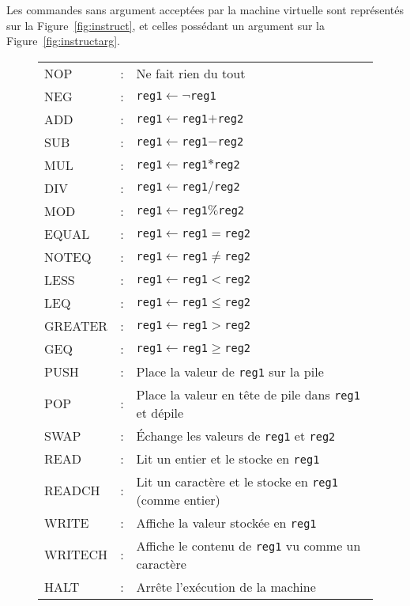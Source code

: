 \documentclass[12pt,a4paper]{article}
\begin{document}
Les commandes sans argument acceptées par la machine virtuelle sont
représentés sur la Figure~\ref{fig:instruct}, et celles possédant un
argument sur la Figure~\ref{fig:instructarg}.

\begin{figure}
  \centering
  \begin{tabular}{lll}
    NOP   &:& Ne fait rien du tout\\
    NEG   &:& \texttt{reg1}$\leftarrow\neg$\texttt{reg1}\\
    ADD   &:& \texttt{reg1}$\leftarrow$\texttt{reg1}$+$\texttt{reg2}\\
    SUB   &:& \texttt{reg1}$\leftarrow$\texttt{reg1}$-$\texttt{reg2}\\
    MUL   &:& \texttt{reg1}$\leftarrow$\texttt{reg1}$*$\texttt{reg2}\\
    DIV   &:& \texttt{reg1}$\leftarrow$\texttt{reg1}$/$\texttt{reg2}\\
    MOD   &:& \texttt{reg1}$\leftarrow$\texttt{reg1}$\%$\texttt{reg2}\\
    EQUAL &:& \texttt{reg1}$\leftarrow$\texttt{reg1}$=$\texttt{reg2}\\
    NOTEQ &:& \texttt{reg1}$\leftarrow$\texttt{reg1}$\neq$\texttt{reg2}\\
    LESS  &:& \texttt{reg1}$\leftarrow$\texttt{reg1}$<$\texttt{reg2}\\
    LEQ   &:& \texttt{reg1}$\leftarrow$\texttt{reg1}$\leqslant$\texttt{reg2}\\
    GREATER &:& \texttt{reg1}$\leftarrow$\texttt{reg1}$>$\texttt{reg2}\\
    GEQ   &:& \texttt{reg1}$\leftarrow$\texttt{reg1}$\geqslant$\texttt{reg2}\\
    PUSH  &:& Place la valeur de \texttt{reg1} sur la pile\\
    POP   &:& Place la valeur en tête de pile dans \texttt{reg1} et dépile\\
    SWAP  &:& Échange les valeurs de \texttt{reg1} et \texttt{reg2}\\
    READ  &:& Lit un entier et le stocke en \texttt{reg1}\\
    READCH  &:& Lit un caractère et le stocke en \texttt{reg1} (comme entier)\\
    WRITE &:& Affiche la valeur stockée en \texttt{reg1}\\
    WRITECH &:& Affiche le contenu de \texttt{reg1} vu comme un caractère\\
    HALT  &:& Arrête l'exécution de la machine\\

\end{tabular}
\end{figure}
\end{document}
